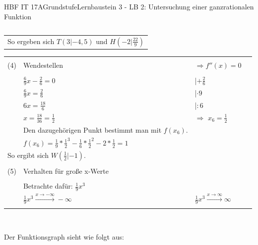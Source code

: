 \documentclass[oneside,openany,headings=optiontotoc,11pt,numbers=noenddot]{scrreprt}
\begin{document}
\begin{worksheet}{HBF IT 17A}{Grundstufe}{Lernbaustein 3 - LB 2: Untersuchung einer ganzrationalen Funktion}
\begin{framed}
\begin{tabularx}{\textwidth}{ll}
			\end{tabularx}
			\begin{tabularx}{\textwidth}{ll}
				\multicolumn{2}{l}{So ergeben sich \colorbox{blue!5}{\(T(3|-4,5)\)} und \colorbox{blue!5}{\(H(-2|\frac{22}{9})\)}}\\
			\end{tabularx}
			\begin{tabularx}{\textwidth}{lXXl}
				\hline\hline\\
				(4) & Wendestellen & \(\Rightarrow f''(x) = 0\)\\
				\hline\\
				& \(\frac{6}{9}x - \frac{2}{6} = 0\) & |\(+\frac{2}{6}\)\\
				& \(\frac{6}{9}x = \frac{2}{6}\) & |\(\cdot9\)\\
				& \(6x = \frac{18}{6}\) & |\(:6\)\\
				& \(x = \frac{18}{36} = \frac{1}{2}\) & \(\Rightarrow\) \colorbox{green!10}{\(x_6 = \frac{1}{2}\)}\\
				& Den dazugehörigen Punkt bestimmt man mit \(f(x_6)\).\\
				& \(f(x_6) = \frac{1}{9}*\frac{1}{2}^3 -\frac{1}{6}*\frac{1}{2}^2 -2*\frac{1}{2} = 1\)\\
				\multicolumn{2}{l}{So ergibt sich \colorbox{blue!5}{\(W(\frac{1}{2}|-1)\)}.}\\
				\hline\hline\\
				(5) & Verhalten für große x-Werte\\
				\hline\\
				& Betrachte dafür: \(\frac{1}{9}x^3\)\\
				& \colorbox{green!10}{\(\frac{1}{9}x^3\xrightarrow{x\rightarrow-\infty}-\infty\)} & \colorbox{green!10}{\(\frac{1}{9}x^3\xrightarrow{x\rightarrow\infty}\infty\)}\\
				\hline\hline\\
			\end{tabularx}\\
			\par\noindent
			Der Funktionsgraph sieht wie folgt aus:\\
			\par

\end{framed}
\end{worksheet}
\end{document}
